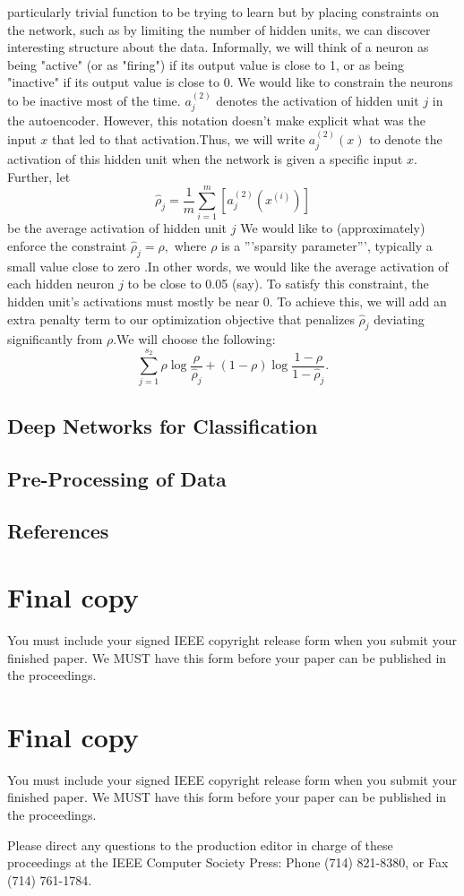 \documentclass[10pt,twocolumn,letterpaper]{article}
\begin{document}
particularly trivial function to be trying to learn but by placing constraints
on the network, such as by limiting the number of hidden units, we can discover
interesting structure about the data.
Informally, we will think of a neuron as being "active" (or as "firing") if
its output value is close to 1, or as being "inactive" if its output value is
close to 0.  We would like to constrain the neurons to be inactive most of the
time. 
$\textstyle a^{(2)}_j$ denotes the activation of hidden unit $\textstyle j$ in the
autoencoder.  However, this notation doesn't make explicit what was the input $ x $
that led to that activation.Thus, we will write $\textstyle a^{(2)}_j(x)$ to denote the activation
of this hidden unit when the network is given a specific input $\textstyle x$.  Further, let
$$\hat\rho_j = \frac{1}{m} \sum_{i=1}^m \left[ a^{(2)}_j(x^{(i)}) \right]
$$ be the average activation of hidden unit $\textstyle j$
We would like to (approximately) enforce the constraint
$ \hat\rho_j = \rho,$
where $\textstyle \rho$ is a '''sparsity parameter''', typically a small value close to zero
.In other words, we would like the average activation
of each hidden neuron $\textstyle j$ to be close to 0.05 (say).  To satisfy this
constraint, the hidden unit's activations must mostly be near 0.
To achieve this, we will add an extra penalty term to our optimization objective that
penalizes $\textstyle \hat\rho_j$ deviating significantly from $\textstyle \rho$.We will choose the following:
$$
\sum_{j=1}^{s_2} \rho \log \frac{\rho}{\hat\rho_j} + (1-\rho) \log \frac{1-\rho}{1-\hat\rho_j}.
$$
\subsection{Deep Networks for Classification}
\subsection{Pre-Processing of Data}
\subsection{References}
\section{Final copy}

You must include your signed IEEE copyright release form when you submit
your finished paper. We MUST have this form before your paper can be
published in the proceedings.
\section{Final copy}

You must include your signed IEEE copyright release form when you submit
your finished paper. We MUST have this form before your paper can be
published in the proceedings.

Please direct any questions to the production editor in charge of these
proceedings at the IEEE Computer Society Press: Phone (714) 821-8380, or
Fax (714) 761-1784.

{\small


}
\end{document}
